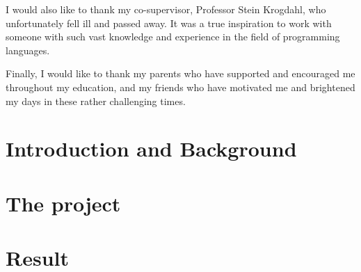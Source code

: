 \documentclass[UKenglish]{ifimaster}
\begin{document}
I would also like to thank my co-supervisor, Professor Stein Krogdahl, who unfortunately fell ill and passed away.
It was a true inspiration to work with someone with such vast knowledge and experience in the field of programming languages.

Finally, I would like to thank my parents who have supported and encouraged me throughout my education, and my friends who have motivated me and brightened my days in these rather challenging times.

\hypersetup{linkcolor=black}

\tableofcontents{}
\listoflistings{}



\cleardoublepage

\hypersetup{linkcolor=blue}

\mainmatter{}


\part{Introduction and Background}\label{part:introduction}





\part{The project}\label{part:the-project}







\part{Result}\label{part:Results}






\backmatter{}
\printbibliography
\end{document}
